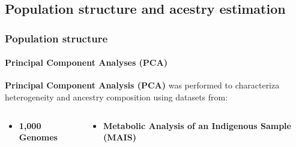 \subsection{Population structure and acestry estimation}
\begin{frame}
    \frametitle{Population structure}
    \framesubtitle{Principal Component Analyses (PCA)}

    \begin{center}
        \textbf{Principal Component Analysis (PCA)} was performed to characteriza heterogeneity and ancestry composition using datasets from:
    \end{center}

    \begin{columns}
        \begin{column}{0.23\textwidth}
            \begin{itemize}[noitemsep,topsep=5pt]
                \item \textbf{\sffamily\color{primary-color} 1,000 Genomes}
            \end{itemize}
        \end{column}

        \begin{column}{0.43\textwidth}
            \begin{itemize}[noitemsep,topsep=0pt]
                \item \textbf{\sffamily\color{primary-color} Metabolic Analysis of an Indigenous Sample (MAIS)}
            \end{itemize}
        \end{column}


\end{columns}
\end{frame}
